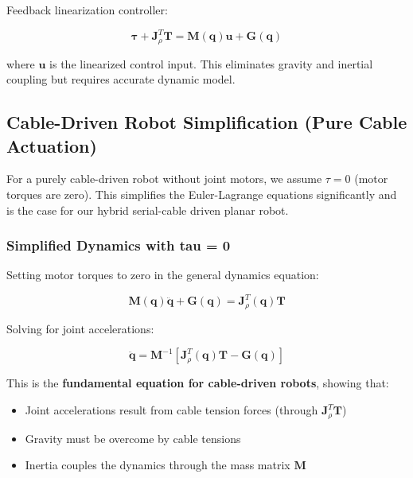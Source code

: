 Feedback linearization controller:

\begin{equation}
\boldsymbol{\tau} + \mathbf{J}_{\rho}^T \mathbf{T} = \mathbf{M}(\mathbf{q}) \mathbf{u} + \mathbf{G}(\mathbf{q})
\end{equation}

where $\mathbf{u}$ is the linearized control input. This eliminates gravity and inertial coupling but requires accurate dynamic model.

\subsection{Cable-Driven Robot Simplification (Pure Cable Actuation)}

For a purely cable-driven robot without joint motors, we assume $\tau = 0$ (motor torques are zero). This simplifies the Euler-Lagrange equations significantly and is the case for our hybrid serial-cable driven planar robot.

\subsubsection{Simplified Dynamics with tau = 0}

Setting motor torques to zero in the general dynamics equation:

\begin{equation}
\mathbf{M}(\mathbf{q}) \ddot{\mathbf{q}} + \mathbf{G}(\mathbf{q}) = \mathbf{J}_{\rho}^T(\mathbf{q}) \mathbf{T}
\end{equation}

Solving for joint accelerations:

\begin{equation}
\ddot{\mathbf{q}} = \mathbf{M}^{-1} \left[ \mathbf{J}_{\rho}^T(\mathbf{q}) \mathbf{T} - \mathbf{G}(\mathbf{q}) \right]
\end{equation}

This is the \textbf{fundamental equation for cable-driven robots}, showing that:
\begin{itemize}
    \item Joint accelerations result from cable tension forces (through $\mathbf{J}_{\rho}^T \mathbf{T}$)
    \item Gravity must be overcome by cable tensions
    \item Inertia couples the dynamics through the mass matrix $\mathbf{M}$
\end{itemize}

